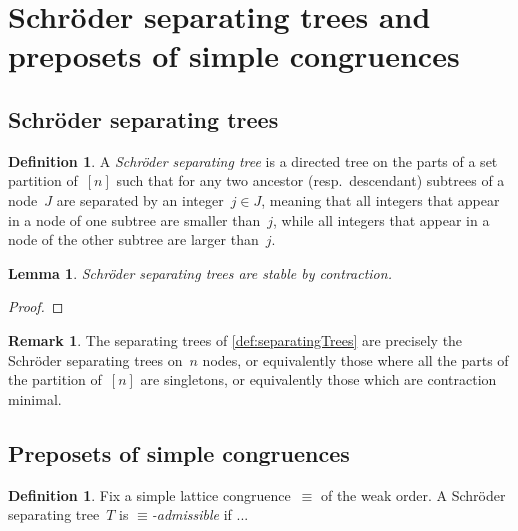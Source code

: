 \documentclass{amsart}
\newtheorem{lemma}[theorem]{Lemma}
\theoremstyle{definition}
\newtheorem{definition}[theorem]{Definition}
\newtheorem{remark}[theorem]{Remark}
\newcommand{\darkblue}{\color{darkblue}} %
\newcommand{\defn}[1]{\textsl{\darkblue #1}} %
\newcommand{\vincent}[1]{\todo[color=blue!30]{#1 \\ \hfill --- V.}}
\begin{document}

\section{Schröder separating trees and preposets of simple congruences}
\label{sec:SchroderSeparatingTreesPreposetsSimpleCongruences}


\subsection{Schröder separating trees}
\label{subsec:SchroderSeparatingTrees}

\begin{definition}
\label{def:ShcroderSeparatingTree}
A \defn{Schröder separating tree} is a directed tree on the parts of a set partition of~$[n]$ such that for any two ancestor (resp.~descendant) subtrees of a node~$J$ are separated by an integer~$j \in J$, meaning that all integers that appear in a node of one subtree are smaller than~$j$, while all integers that appear in a node of the other subtree are larger than~$j$.
\end{definition}

\begin{lemma}
\label{lem:contractionSchroderSeparatingTree}
Schröder separating trees are stable by contraction.
\end{lemma}

\begin{proof}
\vincent{todo}
\end{proof}

\begin{remark}
The separating trees of \cref{def:separatingTrees} are precisely the Schröder separating trees on~$n$ nodes, or equivalently those where all the parts of the partition of~$[n]$ are singletons, or equivalently those which are contraction minimal.
\end{remark}


\subsection{Preposets of simple congruences}
\label{subsec:preposetsSimpleCongruences}

\begin{definition}
\label{def:admissibleSchroderSeparatingTrees}
Fix a simple lattice congruence~$\equiv$ of the weak order.
A Schröder separating tree~$T$ is \defn{$\equiv$-admissible} if ...
\vincent{todo}
\end{definition}
\end{document}
